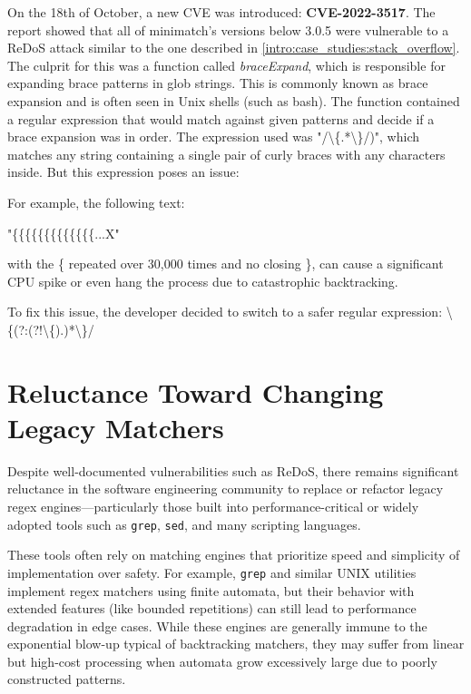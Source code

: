 On the 18th of October, a new CVE was introduced: \textbf{CVE-2022-3517}.
The report showed that all of minimatch's versions below 3.0.5 were vulnerable to a ReDoS attack similar to the one described in \ref{intro:case_studies:stack_overflow}.
The culprit for this was a function called \textit{braceExpand}, which is responsible for expanding brace patterns in glob strings. This is commonly known as brace expansion and is often seen in Unix shells (such as bash). 
The function contained a regular expression that would match against given patterns and decide if a brace expansion was in order. The expression used was "/\textbackslash\{.*\textbackslash\}/)", which matches any string containing a single pair of curly braces with any characters inside. But this expression poses an issue:

For example, the following text:
\begin{center}
	"\{\{\{\{\{\{\{\{\{\{\{\{\{...X"
\end{center}

with the \{ repeated over 30,000 times and no closing \}, can cause a significant CPU spike or even hang the process due to catastrophic backtracking.

To fix this issue, the developer decided to switch to a safer regular expression: \textbackslash\{(?:(?!\textbackslash\{).)*\textbackslash\}/


\section{Reluctance Toward Changing Legacy Matchers}

Despite well-documented vulnerabilities such as ReDoS, there remains significant reluctance in the software engineering community to replace or refactor legacy regex engines—particularly those built into performance-critical or widely adopted tools such as \texttt{grep}, \texttt{sed}, and many scripting languages.

These tools often rely on matching engines that prioritize speed and simplicity of implementation over safety. For example, \texttt{grep} and similar UNIX utilities implement regex matchers using finite automata, but their behavior with extended features (like bounded repetitions) can still lead to performance degradation in edge cases. While these engines are generally immune to the exponential blow-up typical of backtracking matchers, they may suffer from linear but high-cost processing when automata grow excessively large due to poorly constructed patterns.

